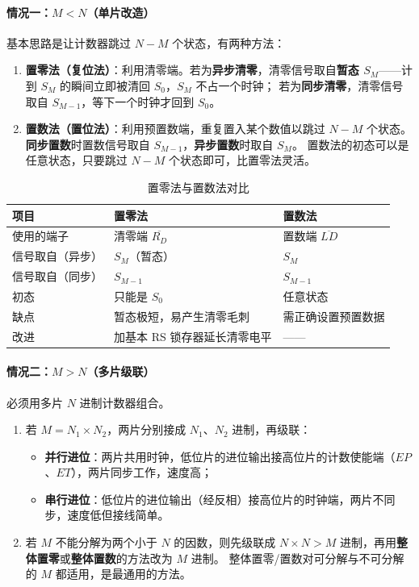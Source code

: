\paragraph{情况一：$M<N$（单片改造）}
基本思路是让计数器跳过 $N-M$ 个状态，有两种方法：
\begin{enumerate}
    \item \textbf{置零法（复位法）}：利用清零端。若为\textbf{异步清零}，清零信号取自\textbf{暂态 $S_M$}——计到 $S_M$ 的瞬间立即被清回 $S_0$，$S_M$ 不占一个时钟；
    若为\textbf{同步清零}，清零信号取自 $S_{M-1}$，等下一个时钟才回到 $S_0$。
    \item \textbf{置数法（置位法）}：利用预置数端，重复置入某个数值以跳过 $N-M$ 个状态。\textbf{同步置数}时置数信号取自 $S_{M-1}$，\textbf{异步置数}时取自 $S_M$。
    置数法的初态可以是任意状态，只要跳过 $N-M$ 个状态即可，比置零法灵活。
\end{enumerate}

\begin{table}[!htbp]
\centering
\caption{置零法与置数法对比}
\begin{tabular}{lll}
\toprule
项目 & 置零法 & 置数法 \\
\midrule
使用的端子 & 清零端 $\overline{R_D}$ & 置数端 $\overline{LD}$ \\
信号取自（异步） & $S_M$（暂态） & $S_M$ \\
信号取自（同步） & $S_{M-1}$ & $S_{M-1}$ \\
初态 & 只能是 $S_0$ & 任意状态 \\
缺点 & 暂态极短，易产生清零毛刺 & 需正确设置预置数据 \\
改进 & 加基本 RS 锁存器延长清零电平 & —— \\
\bottomrule
\end{tabular}
\end{table}

\paragraph{情况二：$M>N$（多片级联）}
必须用多片 $N$ 进制计数器组合。
\begin{enumerate}
    \item 若 $M=N_1\times N_2$，两片分别接成 $N_1$、$N_2$ 进制，再级联：
    \begin{itemize}
        \item \textbf{并行进位}：两片共用时钟，低位片的进位输出接高位片的计数使能端（$EP$、$ET$），两片同步工作，速度高；
        \item \textbf{串行进位}：低位片的进位输出（经反相）接高位片的时钟端，两片不同步，速度低但接线简单。
    \end{itemize}
    \item 若 $M$ 不能分解为两个小于 $N$ 的因数，则先级联成 $N\times N>M$ 进制，再用\textbf{整体置零}或\textbf{整体置数}的方法改为 $M$ 进制。
    整体置零/置数对可分解与不可分解的 $M$ 都适用，是最通用的方法。
\end{enumerate}

